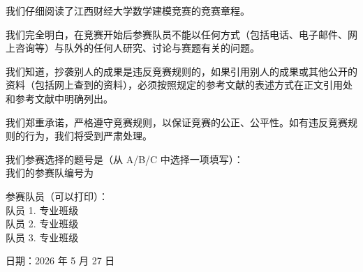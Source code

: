 \documentclass[12pt,a4paper]{ctexart}
\numberwithin{figure}{section}
\numberwithin{table}{section}
\numberwithin{equation}{section}
\begin{document}
{\songti
我们仔细阅读了江西财经大学数学建模竞赛的竞赛章程。

我们完全明白，在竞赛开始后参赛队员不能以任何方式（包括电话、电子邮件、网上咨询等）与队外的任何人研究、讨论与赛题有关的问题。

我们知道，抄袭别人的成果是违反竞赛规则的，如果引用别人的成果或其他公开的资料（包括网上查到的资料），必须按照规定的参考文献的表述方式在正文引用处和参考文献中明确列出。

我们郑重承诺，严格遵守竞赛规则，以保证竞赛的公正、公平性。如有违反竞赛规则的行为，我们将受到严肃处理。

\vspace{1cm}

我们参赛选择的题号是（从 A/B/C 中选择一项填写）：\underline{\hspace{3cm}} \\
\vspace{0.5cm}
我们的参赛队编号为 \underline{\hspace{5cm}} \\

\vspace{1cm}

{\heiti 参赛队员（可以打印）：} \\
\vspace{0.3cm}
队员 1. \underline{\hspace{2cm}} \quad 专业班级 \underline{\hspace{3cm}} \\
\vspace{0.3cm}
队员 2. \underline{\hspace{2cm}} \quad 专业班级 \underline{\hspace{3cm}} \\
\vspace{0.3cm}
队员 3. \underline{\hspace{2cm}} \quad 专业班级 \underline{\hspace{3cm}} \\

\vspace{1.5cm}

日期：2026 年 5 月 27 日
}
\newpage

\setcounter{page}{1}

\begin{center}
    {\heiti %
}
\end{center}
\end{document}
